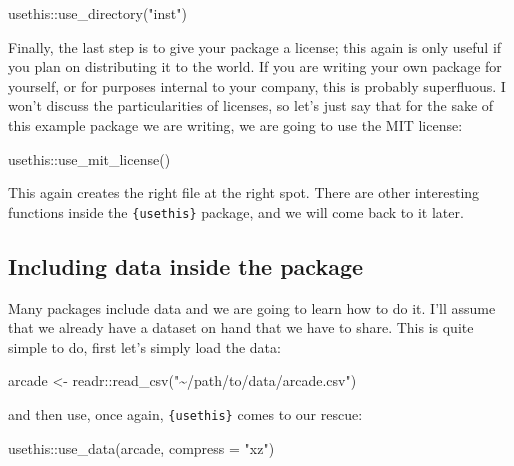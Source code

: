\documentclass[
]{article}
\newenvironment{Shaded}{\begin{snugshade}}{\end{snugshade}}
\newcommand{\AttributeTok}[1]{\textcolor[rgb]{0.77,0.63,0.00}{#1}}
\newcommand{\FunctionTok}[1]{\textcolor[rgb]{0.00,0.00,0.00}{#1}}
\newcommand{\NormalTok}[1]{#1}
\newcommand{\OtherTok}[1]{\textcolor[rgb]{0.56,0.35,0.01}{#1}}
\newcommand{\SpecialCharTok}[1]{\textcolor[rgb]{0.00,0.00,0.00}{#1}}
\newcommand{\StringTok}[1]{\textcolor[rgb]{0.31,0.60,0.02}{#1}}
\begin{document}
\begin{Shaded}
\begin{Highlighting}[]
\NormalTok{usethis}\SpecialCharTok{::}\FunctionTok{use\_directory}\NormalTok{(}\StringTok{"inst"}\NormalTok{)}
\end{Highlighting}
\end{Shaded}

Finally, the last step is to give your package a license; this again is only useful if you plan on
distributing it to the world. If you are writing your own package for yourself, or for purposes
internal to your company, this is probably superfluous. I won't discuss the particularities of
licenses, so let's just say that for the sake of this example package we are writing, we are going
to use the MIT license:

\begin{Shaded}
\begin{Highlighting}[]
\NormalTok{usethis}\SpecialCharTok{::}\FunctionTok{use\_mit\_license}\NormalTok{()}
\end{Highlighting}
\end{Shaded}

This again creates the right file at the right spot. There are other interesting functions inside
the \texttt{\{usethis\}} package, and we will come back to it later.

\hypertarget{including-data-inside-the-package}{%
\subsection{Including data inside the package}\label{including-data-inside-the-package}}

Many packages include data and we are going to learn how to do it. I'll assume that we already
have a dataset on hand that we have to share. This is quite simple to do, first let's simply
load the data:

\begin{Shaded}
\begin{Highlighting}[]
\NormalTok{arcade }\OtherTok{\textless{}{-}}\NormalTok{ readr}\SpecialCharTok{::}\FunctionTok{read\_csv}\NormalTok{(}\StringTok{"\textasciitilde{}/path/to/data/arcade.csv"}\NormalTok{)}
\end{Highlighting}
\end{Shaded}

and then use, once again, \texttt{\{usethis\}} comes to our rescue:

\begin{Shaded}
\begin{Highlighting}[]
\NormalTok{usethis}\SpecialCharTok{::}\FunctionTok{use\_data}\NormalTok{(arcade, }\AttributeTok{compress =} \StringTok{"xz"}\NormalTok{)}
\end{Highlighting}
\end{Shaded}
\end{document}
